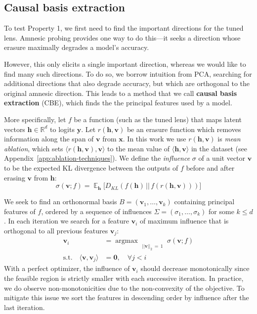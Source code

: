 \documentclass{article}
\theoremstyle{plain}
\theoremstyle{definition}
\newcommand{\E}{\mathop{\mathbb{E}}}      %
\newcommand{\R}{\mathbb{R}}      %
\newcommand{\innerproduct}[2]{\langle #1, #2 \rangle}
\newcommand{\hh}{\boldsymbol h} %
\newcommand{\vv}{\boldsymbol v} %
\newcommand{\xx}{\boldsymbol x} %
\newcommand{\yy}{\boldsymbol y} %
\begin{document}
\subsection{Causal basis extraction}
\label{cbe}

To test Property 1, we first need to find the important directions for the tuned lens. Amnesic probing \cite{elazar2021amnesic} provides one way to do this---it seeks a direction whose erasure maximally degrades a model's accuracy.

However, this only elicits a single important direction, whereas we would like to find many such directions. To do so, we borrow intuition from PCA, searching for additional directions that also degrade accuracy, but which are orthogonal to the original amnesic direction. This leads to a method that we call \textbf{causal basis extraction} (CBE), which finds the the principal features used by a model.

More specifically, let $f$ be a function (such as the tuned lens) that maps latent vectors $\hh \in \R^d$ to logits $\yy$. Let $r(\hh, \vv)$ be an erasure function which removes information along the span of $\vv$ from $\xx$. In this work we use $r(\hh, \vv)$ is \emph{mean ablation}, which sets $\langle r(\hh, \vv), \vv \rangle$ to the mean value of $\langle \hh, \vv \rangle$ in the dataset (see Appendix~\ref{app:ablation-techniques}).
We define the \emph{influence} $\sigma$ of a unit vector $\vv$ to be the expected KL divergence between the outputs of $f$ before and after erasing $\vv$ from $\hh$:
\begin{equation}\label{eq:kl-influence}
\sigma(\vv; f) = \E_{\hh}\Big[D_{KL}(f(\hh)\,||\,f(r(\hh, \vv)))\Big]
\end{equation}

We seek to find an orthonormal basis $B = (\vv_1, \ldots, \vv_k)$ containing principal features of $f$, ordered by a sequence of influences $\Sigma = (\sigma_1, \ldots, \sigma_k)$ for some $k \leq d$. 
In each iteration we search for a feature $\vv_i$ of maximum influence that is orthogonal to all previous features $\vv_j$:
\begin{equation}\label{eq:cbe}
\begin{aligned}
\vv_i &= \mathop{\mathrm{argmax\:}}_{\substack{\\[1pt]||\vv||_2\,=\,1}} \sigma(\vv; f)\\
\textrm{s.t.} \quad \innerproduct{\vv}{\vv_j} &= \boldsymbol 0, \quad \forall j < i
\end{aligned}
\end{equation}
With a perfect optimizer, the influence of $\vv_i$ should decrease monotonically since the feasible region is strictly smaller with each successive iteration. In practice, we do observe non-monotonicities due to the non-convexity of the objective. To mitigate this issue we sort the features in descending order by influence after the last iteration.
\end{document}

